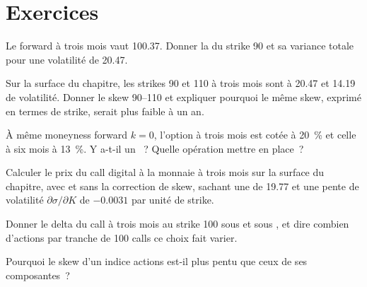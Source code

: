 \section{Exercices}

\begin{exercise}[$\star$]\label{exo:dv:implied-volatility-and-its-surface:1}
Le forward à trois mois vaut 100.37. Donner la  du strike 90 et sa
variance totale pour une volatilité de 20.47.
\end{exercise}

\begin{exercise}[$\star$]\label{exo:dv:implied-volatility-and-its-surface:2}
Sur la surface du chapitre, les strikes 90 et 110 à trois mois sont à 20.47 et 14.19
de volatilité. Donner le skew 90--110 et expliquer pourquoi le même skew, exprimé en
termes de strike, serait plus faible à un an.
\end{exercise}

\begin{exercise}[$\star$]\label{exo:dv:implied-volatility-and-its-surface:3}
À même moneyness forward $k=0$, l'option à trois mois est cotée à 20~\% et
celle à six mois à 13~\%. Y a-t-il un ~? Quelle opération mettre en place~?
\end{exercise}

\begin{exercise}[$\star\star$]\label{exo:dv:implied-volatility-and-its-surface:4}
Calculer le prix du call digital à la monnaie à trois mois sur la surface du chapitre, avec et sans
la correction de skew, sachant une  de 19.77 et une pente de volatilité $\partial\sigma/\partial K$
de $-0.0031$ par unité de strike.
\end{exercise}

\begin{exercise}[$\star\star$]\label{exo:dv:implied-volatility-and-its-surface:5}
Donner le delta du call à trois mois au strike 100 sous  et sous
, et dire combien d'actions par tranche de 100 calls ce choix fait varier.
\end{exercise}

\begin{exercise}[$\star\star$]\label{exo:dv:implied-volatility-and-its-surface:6}
Pourquoi le skew d'un indice actions est-il plus pentu que ceux de ses composantes~?
\end{exercise}

